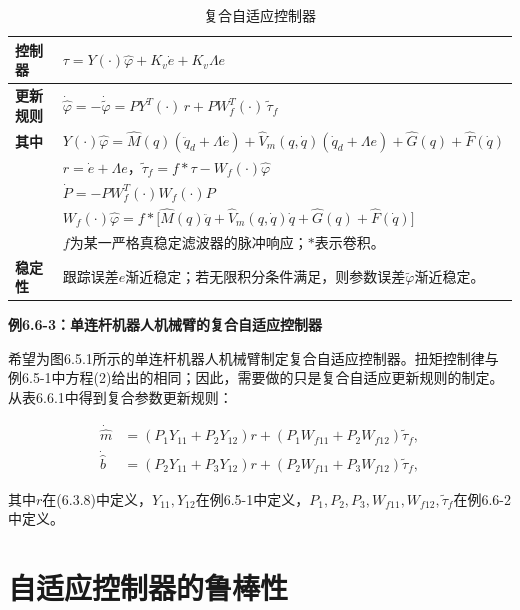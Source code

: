 \documentclass[12pt,a4paper]{ctexart}
\begin{document}
\begin{table}[H]
\centering
\caption{复合自适应控制器}\label{tab:6.6.1}
\begin{tabular}{|l|l|}
\hline
\textbf{控制器}
& $\tau = Y(\cdot)\hat{\varphi} + K_v\dot{e} + K_v\Lambda e$ \\ \hline
\textbf{更新规则}
& $\displaystyle \dot{\hat{\varphi}} = -\dot{\tilde{\varphi}} = P Y^T(\cdot)\, r + P W_f^T(\cdot)\, \tilde{\tau}_f$ \\ \hline
\textbf{其中}
& $\displaystyle Y(\cdot)\hat{\varphi} = \hat{M}(q)(\ddot{q}_d + \Lambda\dot{e}) + \hat{V}_m(q, \dot{q})(\dot{q}_d + \Lambda e) + \hat{G}(q) + \hat{F}(\dot{q})$ \\
& $r=\dot{e}+\Lambda e$，$\tilde{\tau}_f=f*\tau-W_f(\cdot)\hat{\varphi}$ \\
& $\displaystyle \dot{P} = -P W_f^T(\cdot)W_f(\cdot)P$ \\
& $\displaystyle W_f(\cdot)\hat{\varphi} = f * \bigl[\hat{M}(q)\ddot{q} + \hat{V}_m(q, \dot{q})\dot{q} + \hat{G}(q) + \hat{F}(\dot{q})\bigr]$ \\
& $f$为某一严格真稳定滤波器的脉冲响应；$*$表示卷积。 \\ \hline
\textbf{稳定性}
& 跟踪误差$e$渐近稳定；若无限积分条件满足，则参数误差$\tilde{\varphi}$渐近稳定。 \\ \hline
\end{tabular}
\end{table}

\textbf{例6.6-3：单连杆机器人机械臂的复合自适应控制器}

希望为图6.5.1所示的单连杆机器人机械臂制定复合自适应控制器。扭矩控制律与例6.5-1中方程(2)给出的相同；因此，需要做的只是复合自适应更新规则的制定。从表6.6.1中得到复合参数更新规则：

\begin{align}
\dot{\hat{m}} &= (P_1 Y_{11} + P_2 Y_{12}) r + (P_1 W_{f11} + P_2 W_{f12}) \tilde{\tau}_f, \\
\dot{\hat{b}} &= (P_2 Y_{11} + P_3 Y_{12}) r + (P_2 W_{f11} + P_3 W_{f12}) \tilde{\tau}_f,
\end{align}

其中$r$在(6.3.8)中定义，$Y_{11}, Y_{12}$在例6.5-1中定义，$P_1, P_2, P_3, W_{f11}, W_{f12}, \tilde{\tau}_f$在例6.6-2中定义。

\section{自适应控制器的鲁棒性}\label{sec:robustness}
\end{document}
